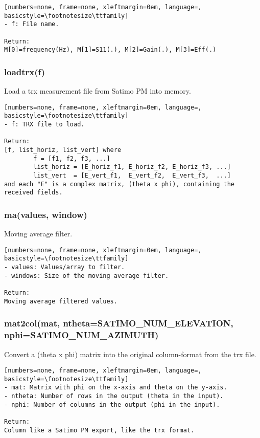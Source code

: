 \begin{lstlisting}[numbers=none, frame=none, xleftmargin=0em, language=, basicstyle=\footnotesize\ttfamily]
- f: File name.

Return:
M[0]=frequency(Hz), M[1]=S11(.), M[2]=Gain(.), M[3]=Eff(.)
\end{lstlisting}

\subsubsection{loadtrx(f)}
Load a trx measurement file from Satimo PM into memory. 

\begin{lstlisting}[numbers=none, frame=none, xleftmargin=0em, language=, basicstyle=\footnotesize\ttfamily]
- f: TRX file to load.

Return:
[f, list_horiz, list_vert] where
        f = [f1, f2, f3, ...]
        list_horiz = [E_horiz_f1, E_horiz_f2, E_horiz_f3, ...]
        list_vert  = [E_vert_f1,  E_vert_f2,  E_vert_f3,  ...]
and each "E" is a complex matrix, (theta x phi), containing the received fields.
\end{lstlisting}

\subsubsection{ma(values, window)}
Moving average filter.

\begin{lstlisting}[numbers=none, frame=none, xleftmargin=0em, language=, basicstyle=\footnotesize\ttfamily]
- values: Values/array to filter.
- windows: Size of the moving average filter.

Return:
Moving average filtered values.
\end{lstlisting}

\subsubsection{mat2col(mat, ntheta=SATIMO\_NUM\_ELEVATION, nphi=SATIMO\_NUM\_AZIMUTH)}
Convert a (theta x phi) matrix into the original column-format from the trx
file.

\begin{lstlisting}[numbers=none, frame=none, xleftmargin=0em, language=, basicstyle=\footnotesize\ttfamily]
- mat: Matrix with phi on the x-axis and theta on the y-axis.
- ntheta: Number of rows in the output (theta in the input).
- nphi: Number of columns in the output (phi in the input).

Return:
Column like a Satimo PM export, like the trx format.
\end{lstlisting}

